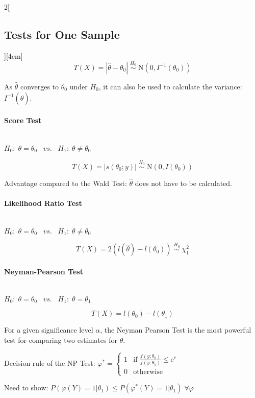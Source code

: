 \documentclass[8pt]{extarticle}
\begin{document}
\begin{multicols}{2}[\subsection{Tests for One Sample}][4cm]
  $$T(X) = |\hat{\theta} - \theta_0|\; \overset{H_0}{\sim}\; \mathrm{N}(0, I^{-1}(\theta_0))$$
  
  \noindent As $\hat{\theta}$ converges to $\theta_0$ under $H_0$, it can also be used to calculate the variance: $I^{-1}(\hat{\theta})$.
  
    \paragraph{Score Test} \ \\
  
  \noindent $H_0\!:\; \theta = \theta_0 \;\;\; vs. \;\;\; H_1\!:\; \theta \neq \theta_0$
  
  $$T(X) = |s(\theta_0;y)|\; \overset{H_0}{\sim}\; \mathrm{N}(0, I(\theta_0))$$
  
  \noindent Advantage compared to the Wald Test: $\hat{\theta}$ does not have to be calculated.
  
      \paragraph{Likelihood Ratio Test} \ \\
  
  \noindent $H_0\!:\; \theta = \theta_0 \;\;\; vs. \;\;\; H_1\!:\; \theta \neq \theta_0$
  
  $$T(X) = 2(l(\hat{\theta}) - l(\theta_0)) \; \overset{H_0}{\sim}\; \chi^2_1$$
  
      \paragraph{Neyman-Pearson Test} \ \\
  
  \noindent $H_0\!:\; \theta = \theta_0 \;\;\; vs. \;\;\; H_1\!:\; \theta = \theta_1$
  
  $$T(X) = l(\theta_0) - l(\theta_1)$$
  
  \noindent For a given significance level $\alpha$, the Neyman Pearson Test is the most powerful test for comparing two estimates for $\theta$.
  
\begin{Proof}
Decision rule of the NP-Test: $\varphi^* {=} \begin{cases} 1 & \text{if } \frac{f(y;\theta_0)}{f(y;\theta_1)} \leq \mathrm{e}^c\\ 0 & \text{otherwise} \end{cases}$

\noindent Need to show: $P(\varphi(Y) {=} 1|\theta_1) \leq P(\varphi^*(Y) {=} 1|\theta_1)\; \forall \varphi$ 


\end{Proof}
\end{multicols}
\end{document}
